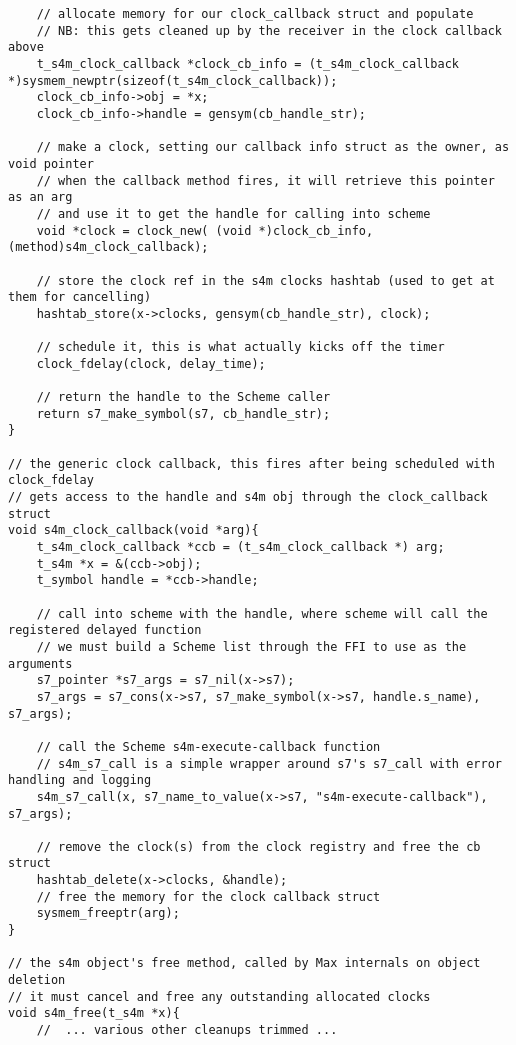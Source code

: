 \documentclass[acmsmall]{acmart}
\begin{document}
{\begin{verbatim}
    // allocate memory for our clock_callback struct and populate
    // NB: this gets cleaned up by the receiver in the clock callback above
    t_s4m_clock_callback *clock_cb_info = (t_s4m_clock_callback *)sysmem_newptr(sizeof(t_s4m_clock_callback));
    clock_cb_info->obj = *x;
    clock_cb_info->handle = gensym(cb_handle_str);

    // make a clock, setting our callback info struct as the owner, as void pointer
    // when the callback method fires, it will retrieve this pointer as an arg 
    // and use it to get the handle for calling into scheme  
    void *clock = clock_new( (void *)clock_cb_info, (method)s4m_clock_callback);

    // store the clock ref in the s4m clocks hashtab (used to get at them for cancelling) 
    hashtab_store(x->clocks, gensym(cb_handle_str), clock); 

    // schedule it, this is what actually kicks off the timer
    clock_fdelay(clock, delay_time);

    // return the handle to the Scheme caller
    return s7_make_symbol(s7, cb_handle_str);
}

// the generic clock callback, this fires after being scheduled with clock_fdelay 
// gets access to the handle and s4m obj through the clock_callback struct 
void s4m_clock_callback(void *arg){
    t_s4m_clock_callback *ccb = (t_s4m_clock_callback *) arg;
    t_s4m *x = &(ccb->obj);
    t_symbol handle = *ccb->handle; 

    // call into scheme with the handle, where scheme will call the registered delayed function
    // we must build a Scheme list through the FFI to use as the arguments
    s7_pointer *s7_args = s7_nil(x->s7);
    s7_args = s7_cons(x->s7, s7_make_symbol(x->s7, handle.s_name), s7_args); 

    // call the Scheme s4m-execute-callback function
    // s4m_s7_call is a simple wrapper around s7's s7_call with error handling and logging 
    s4m_s7_call(x, s7_name_to_value(x->s7, "s4m-execute-callback"), s7_args);   

    // remove the clock(s) from the clock registry and free the cb struct
    hashtab_delete(x->clocks, &handle);
    // free the memory for the clock callback struct 
    sysmem_freeptr(arg);
}

// the s4m object's free method, called by Max internals on object deletion
// it must cancel and free any outstanding allocated clocks
void s4m_free(t_s4m *x){ 
    //  ... various other cleanups trimmed ...


\end{verbatim}}
\end{document}
